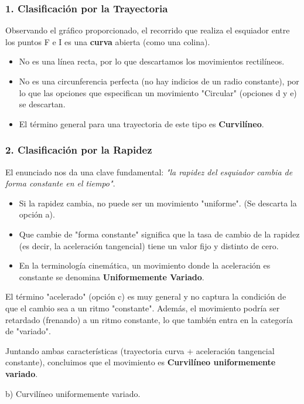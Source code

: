 \documentclass[12pt, a4paper]{article}
\begin{document}
\subsubsection*{1. Clasificación por la Trayectoria}
Observando el gráfico proporcionado, el recorrido que realiza el esquiador entre los puntos F e I es una \textbf{curva} abierta (como una colina). 
\begin{itemize}
    \item No es una línea recta, por lo que descartamos los movimientos rectilíneos.
    \item No es una circunferencia perfecta (no hay indicios de un radio constante), por lo que las opciones que especifican un movimiento "Circular" (opciones d y e) se descartan.
    \item El término general para una trayectoria de este tipo es \textbf{Curvilíneo}.
\end{itemize}

\subsubsection*{2. Clasificación por la Rapidez}
El enunciado nos da una clave fundamental: \textit{"la rapidez del esquiador cambia de forma constante en el tiempo"}.
\begin{itemize}
    \item Si la rapidez cambia, no puede ser un movimiento "uniforme". (Se descarta la opción a).
    \item Que cambie de "forma constante" significa que la tasa de cambio de la rapidez (es decir, la aceleración tangencial) tiene un valor fijo y distinto de cero. 
    \item En la terminología cinemática, un movimiento donde la aceleración es constante se denomina \textbf{Uniformemente Variado}.
\end{itemize}

El término "acelerado" (opción c) es muy general y no captura la condición de que el cambio sea a un ritmo "constante". Además, el movimiento podría ser retardado (frenando) a un ritmo constante, lo que también entra en la categoría de "variado".

Juntando ambas características (trayectoria curva + aceleración tangencial constante), concluimos que el movimiento es \textbf{Curvilíneo uniformemente variado}.

\begin{tcolorbox}[colback=green!5!white, colframe=green!50!black, title=Respuesta Final]
\centering \Large b) Curvilíneo uniformemente variado.
\end{tcolorbox}
\end{document}

